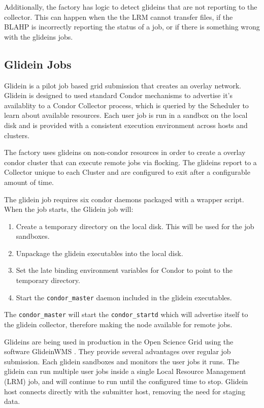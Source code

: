 \documentclass[11pt]{article}
\begin{document}
Additionally, the factory has logic to detect glideins that are not reporting to the collector.  This can happen when the the LRM cannot transfer files, if the BLAHP is incorrectly reporting the status of a job, or if there is something wrong with the glideins jobs.

\subsection{Glidein Jobs}
Glidein  \cite{frey2002condor} is a pilot job based grid submission that creates an overlay network.  Glidein is designed to used standard Condor mechanisms to advertise it's availablity to a Condor Collector process, which is queried by the Scheduler to learn about available resources.  Each user job is run in a sandbox on the local disk and is provided with a consistent execution environment across hosts and clusters.  

The factory uses glideins on non-condor resources in order to create a overlay condor cluster that can execute remote jobs via flocking.  The glideins report to a Collector unique to each Cluster and are configured to exit after a configurable amount of time. 

The glidein job requires six condor daemons packaged with a wrapper script.  When the job starts, the Glidein job will:

\begin{enumerate}
\item Create a temporary directory on the local disk.  This will be used for the job sandboxes.
\item Unpackage the glidein executables into the local disk.
\item Set the late binding environment variables for Condor to point to the temporary directory.
\item Start the  \texttt{condor\_master} daemon included in the glidein executables.
\end{enumerate}

The \texttt{condor\_master} will start the \texttt{condor\_startd} which will advertise itself to the glidein collector, therefore making the node available for remote jobs.  

Glideins are being used in production in the Open Science Grid using the software GlideinWMS \cite{sfiligoi2008glideinwms}.  They provide several advantages over regular job submission.  Each glidein sandboxes and monitors the user jobs it runs.  The glidein can run multiple user jobs inside a single Local Resource Management (LRM) job, and will continue to run until the configured time to stop.  Glidein host connects directly with the submitter host, removing the need for staging data.
\end{document}
